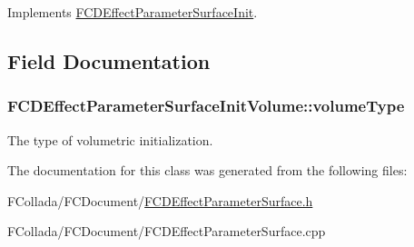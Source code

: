 Implements \hyperlink{classFCDEffectParameterSurfaceInit_ad0109233e63c892e5963a3ca67f7108f}{FCDEffectParameterSurfaceInit}.



\subsection{Field Documentation}
\hypertarget{classFCDEffectParameterSurfaceInitVolume_aad5bb8a564f3583dce34eb2b916d87e7}{
\subsubsection[{volumeType}]{ {\bf FCDEffectParameterSurfaceInitVolume::volumeType}}}
\label{classFCDEffectParameterSurfaceInitVolume_aad5bb8a564f3583dce34eb2b916d87e7}
The type of volumetric initialization. 

The documentation for this class was generated from the following files:\begin{DoxyCompactItemize}
\item 
FCollada/FCDocument/\hyperlink{FCDEffectParameterSurface_8h}{FCDEffectParameterSurface.h}\item 
FCollada/FCDocument/FCDEffectParameterSurface.cpp\end{DoxyCompactItemize}
